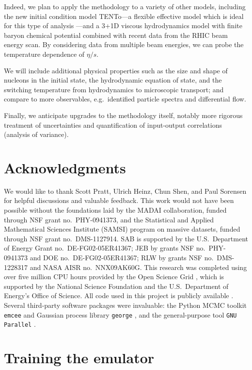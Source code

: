 \documentclass[aps,prc,reprint,superscriptaddress,amsmath]{revtex4-1}
\newcommand{\trento}{T\raisebox{-.5ex}{R}ENTo}
\begin{document}
Indeed, we plan to apply the methodology to a variety of other models, including the new initial condition model \trento---a flexible effective model which is ideal for this type of analysis \cite{Moreland:2014oya}---and a 3+1D viscous hydrodynamics model with finite baryon chemical potential combined with recent data from the RHIC beam energy scan.
By considering data from multiple beam energies, we can probe the temperature dependence of $\eta/s$.

We will include additional physical properties such as the size and shape of nucleons in the initial state, the hydrodynamic equation of state, and the switching temperature from hydrodynamics to microscopic transport; and compare to more observables, e.g.\ identified particle spectra and differential flow.

Finally, we anticipate upgrades to the methodology itself, notably more rigorous treatment of uncertainties and quantification of input-output correlations (analysis of variance).


\section*{Acknowledgments}

We would like to thank Scott Pratt, Ulrich Heinz, Chun Shen, and Paul Sorensen for helpful discussions and valuable feedback.
This work would not have been possible without the foundations laid by the MADAI collaboration, funded through NSF grant no.~PHY-0941373, and the Statistical and Applied Mathematical Sciences Institute (SAMSI) program on massive datasets, funded through NSF grant no.~DMS-1127914.
SAB is supported by the U.S.\ Department of Energy Grant no.~DE-FG02-05ER41367;
JEB by grants NSF no.~PHY-0941373 and DOE no.~DE-FG02-05ER41367;
RLW by grants NSF no.~DMS-1228317 and NASA AISR no.~NNX09AK60G.
This research was completed using over five million CPU hours provided by the Open Science Grid \cite{Pordes:2007zzb,Sfiligoi:2010zz}, which is supported by the National Science Foundation and the U.S.\ Department of Energy's Office of Science.
All code used in this project is publicly available \cite{Bernhard:2015mtd}.
Several third-party software packages were invaluable:
the Python MCMC toolkit \texttt{emcee} \cite{FM:2013mc} and Gaussian process library \texttt{george} \cite{Ambikasaran:2014gp}, and the general-purpose tool \texttt{GNU Parallel} \cite{Tange:2011pa}.


\appendix

\section{\label{app:train}Training the emulator}
\end{document}

